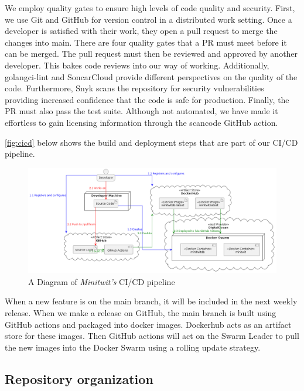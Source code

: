 We employ quality gates to ensure high levels of code quality and security.
First, we use Git and GitHub for version control in a distributed work setting.
Once a developer is satisfied with their work, they open a pull request to merge the changes into main.
There are four quality gates that a PR must meet before it can be merged.
The pull request must then be reviewed and approved by another developer.
This bakes code reviews into our way of working.
Additionally, golangci-lint and SoncarCloud provide different perspectives on the quality of the code.
Furthermore, Snyk scans the repository for security vulnerabilities providing increased confidence that the code is safe for production.
Finally, the PR must also pass the test suite.
Although not automated, we have made it effortless to gain licensing information through the scancode GitHub action.

\autoref{fig:cicd} below shows the build and deployment steps that are part of our CI/CD pipeline.

\begin{figure}[H]
    \centering
    \includegraphics[scale=0.35]{images/cicd/cicd.png}
    \caption{A Diagram of \textit{Minitwit's} CI/CD pipeline}
    \label{fig:cicd}
\end{figure}

When a new feature is on the main branch, it will be included in the next weekly release.
When we make a release on GitHub, the main branch is built using GitHub actions and packaged into docker images. 
Dockerhub acts as an artifact store for these images.
Then GitHub actions will act on the Swarm Leader to pull the new images into the Docker Swarm using a rolling update strategy.

\subsection{Repository organization}

